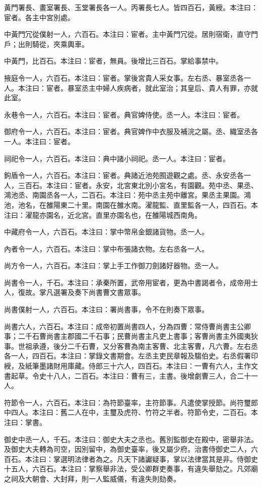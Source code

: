\begin{pinyinscope}
黃門署長、畫室署長、玉堂署長各一人。丙署長七人。皆四百石，黃綬。本注曰：宦者。各主中宮別處。

中黃門冗從僕射一人，六百石。本注曰：宦者。主中黃門冗從。居則宿衛，直守門戶；出則騎從，夾乘輿車。

中黃門，比百石。本注曰：宦者，無員。後增比三百石。掌給事禁中。

掖庭令一人，六百石。本注曰：宦者。掌後宮貴人采女事。左右丞、暴室丞各一人。本注曰：宦者。暴室丞主中婦人疾病者，就此室治；其皇后、貴人有罪，亦就此室。

永巷令一人，六百石。本注曰：宦者。典官婢侍使。丞一人。本注曰：宦者。

御府令一人，六百石。本注曰：宦者。典官婢作中衣服及補浣之屬。丞、織室丞各一人。本注曰：宦者。

祠祀令一人，六百石。本注曰：典中諸小祠祀。丞一人。本注曰：宦者。

鉤盾令一人，六百石。本注曰：宦者。典諸近池苑囿遊觀之處。丞、永安丞各一人，三百石。本注曰：宦者。永安，北宮東北別小宮名，有園觀。苑中丞、果丞、鴻池丞、南園丞各一人，二百石。本注曰：苑中丞主苑中離宮。果丞主果園。鴻池，池名，在雒陽東二十里。南園在雒水南。濯龍監、直里監各一人，四百石。本注曰：濯龍亦園名，近北宮。直里亦園名也，在雒陽城西南角。

中藏府令一人，六百石。本注曰：掌中幣帛金銀諸貨物。丞一人。

內者令一人，六百石。本注曰：掌中布張諸衣物。左右丞各一人。

尚方令一人，六百石。本注曰：掌上手工作御刀劍諸好器物。丞一人。

尚書令一人，千石。本注曰：承秦所置，武帝用宦者，更為中書謁者令，成帝用士人，復故。掌凡選署及奏下尚書曹文書眾事。

尚書僕射一人，六百石。本注曰：署尚書事，令不在則奏下眾事。

尚書六人，六百石。本注曰：成帝初置尚書四人，分為四曹：常侍曹尚書主公卿事；二千石曹尚書主郡國二千石事；民曹尚書主凡吏上書事；客曹尚書主外國夷狄事。世祖承遵，後分二千石曹，又分客曹為南主客曹、北主客曹，凡六曹。左右丞各一人，四百石。本注曰：掌錄文書期會。左丞主吏民章報及騶伯史。右丞假署印綬，及紙筆墨諸財用庫藏。侍郎三十六人，四百石。本注曰：一曹有六人，主作文書起草。令史十八人，二百石。本注曰：曹有三，主書。後增劇曹三人，合二十一人。

符節令一人，六百石。本注曰：為符節臺率，主符節事。凡遣使掌授節。尚符璽郎中四人。本注曰：舊二人在中，主璽及虎符、竹符之半者。符節令史，二百石。本注曰：掌書。

御史中丞一人，千石。本注曰：御史大夫之丞也。舊別監御史在殿中，密舉非法。及御史大夫轉為司空，因別留中，為御史臺率，後又屬少府。治書侍御史二人，六百石。本注曰：掌選明法律者為之。凡天下諸讞疑事，掌以法律當其是非。侍御史十五人，六百石。本注曰：掌察舉非法，受公卿群吏奏事，有違失舉劾之。凡郊廟之祠及大朝會、大封拜，則一人監威儀，有違失則劾奏。


\end{pinyinscope}
